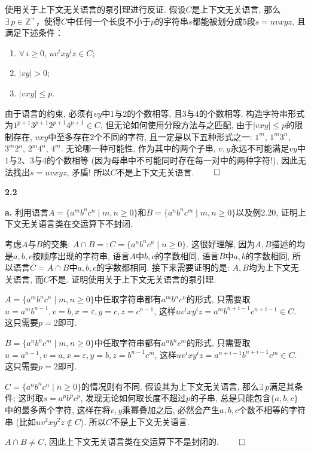 \documentclass[UTF8]{report}
\newcommand{\Z}{\mathbb{Z}}
\newcommand{\problem}[1]{{\setlength{\parskip}{10pt}\noindent \bf{#1}}}
\renewenvironment{proof}{{\setlength{\parskip}{7pt}\noindent\hskip 2em \bf 证明 \quad}}{\hfill$\qed$\par}
\begin{document}
\begin{proof}
    使用关于上下文无关语言的泵引理进行反证. 假设$C$是上下文无关语言, 那么$\exists\,p \in \Z^+$，使得$C$中任何一个长度不小于$p$的宇符串$s$都能被划分成$5$段$s=uvxyz$, 且满足下述条件：
    \begin{enumerate}
        \item $\forall\,i\geq 0$, $uv^i xy^iz \in C$;
        \item $|vy| > 0$;
        \item $|vxy| \leq p$.
    \end{enumerate}

    由于语言的约束, 必须有$vy$中$1$与$2$的个数相等, 且$3$与$4$的个数相等. 构造字符串形式为$1^{p+1}3^{p+1}2^{p+1}4^{p+1} \in C$, 但无论如何使用分段方法与之匹配, 由于$|vxy| \leq p$的限制存在, $vxy$中至多存在$2$个不同的字符, 且一定是以下五种形式之一: $1^m$, $1^m3^n$, $3^m2^n$, $2^m4^n$, $4^m$. 无论哪一种可能性, 作为其中的两个子串, $v, y$永远不可能满足$vy$中$1$与$2$、$3$与$4$的个数相等 (因为母串中不可能同时存在每一对中的两种字符!), 因此无法找出$s=uvxyz$, 矛盾! 所以$C$不是上下文无关语言.
\end{proof}


\problem{2.2}

\problem{a.} 利用语言$A = \{a^m b^n c^n \mid m,n \geq 0\}$和$B = \{a^n b^n c^m \mid m,n \geq 0\}$以及例2.20, 证明上下文无关语言类在交运算下不封闭.

\begin{proof}
    考虑$A$与$B$的交集: $A \cap B =: C = \{a^n b^n c^n \mid n \geq 0\}$. 这很好理解, 因为$A, B$描述的均是$a,b,c$按顺序出现的字符串, 语言$A$中$b,c$的字数相同, 语言$B$中$a,b$的字数相同, 所以语言$C = A \cap B$中$a,b,c$的字数都相同. 接下来需要证明的是: $A,B$均为上下文无关语言, 而$C$不是. 证明使用关于上下文无关语言的泵引理.

    $A = \{a^m b^n c^n \mid m,n \geq 0\}$中任取字符串都有$a^m b^n c^n$的形式, 只需要取$u = a^mb^{n-1}, v = b, x = \varepsilon, y = c, z = c^{n-1}$, 这样$uv^i xy^iz = a^m b^{n+i-1} c^{n+i-1} \in C$. 这只需要$p=2$即可.
    
    $B = \{a^n b^n c^m \mid m,n \geq 0\}$中任取字符串都有$a^n b^n c^m$的形式, 只需要取$u = a^{n-1}, v = a, x = \varepsilon, y = b, z = b^{n-1}c^m$, 这样$uv^i xy^iz = a^{n+i-1} b^{n+i-1} c^m \in C$. 这只需要$p=2$即可.
    
    $C = \{a^n b^n c^n \mid n \geq 0\}$的情况则有不同. 假设其为上下文无关语言, 那么$\exists\,p$满足其条件; 这时取$s = a^p b^p c^p$, 发现无论如何取长度不超过$p$的子串, 总是只能包含$\{a,b,c\}$中的最多两个字符, 这样在将$v,y$乘幂叠加之后, 必然会产生$a,b,c$个数不相等的字符串 (比如$uv^2xy^2z \notin C$). 所以$C$不是上下文无关语言.

    $A \cap B \neq C$, 因此上下文无关语言类在交运算下不是封闭的.
\end{proof}
\end{document}

